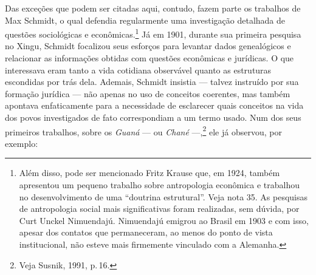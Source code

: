 Das exceções que podem ser citadas aqui, contudo, fazem parte os
trabalhos de Max Schmidt, o qual defendia regularmente uma investigação
detalhada de questões sociológicas e econômicas.\footnote{Além disso,
  pode ser mencionado Fritz Krause que, em 1924, também apresentou um
  pequeno trabalho sobre antropologia econômica e trabalhou no
  desenvolvimento de uma ``doutrina estrutural''. Veja nota 35. As
  pesquisas de antropologia social mais significativas foram realizadas,
  sem dúvida, por Curt Unckel Nimuendajú. Nimuendajú
  emigrou ao Brasil em 1903 e com isso, apesar dos contatos que
  permaneceram, ao menos do ponto de vista institucional, não esteve
  mais firmemente vinculado com a Alemanha.} Já em 1901, durante sua
primeira pesquisa no Xingu, Schmidt focalizou seus esforços para
levantar dados genealógicos e relacionar as informações obtidas com
questões econômicas e jurídicas. O que interessava eram tanto a vida
cotidiana observável quanto as estruturas escondidas por trás dela.
Ademais, Schmidt insistia --- talvez instruído por sua formação jurídica
--- não apenas no uso de conceitos coerentes, mas também apontava
enfaticamente para a necessidade de esclarecer quais conceitos na vida
dos povos investigados de fato correspondiam a um termo usado. Num dos
seus primeiros trabalhos, sobre os \textit{Guaná} --- ou \textit{Chané} ---,\footnote{Veja
  Susnik, 1991, p.\,16.} ele já observou, por exemplo:

